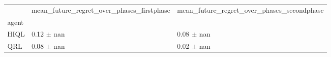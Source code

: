 \begin{tabular}{lll}
\toprule
 & mean_future_regret_over_phases_firstphase & mean_future_regret_over_phases_secondphase \\
agent &  &  \\
\midrule
HIQL & 0.12 $\pm$ nan & 0.08 $\pm$ nan \\
QRL & 0.08 $\pm$ nan & 0.02 $\pm$ nan \\
\bottomrule
\end{tabular}
